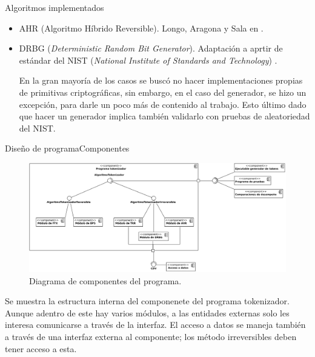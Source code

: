 \begin{frame}{Algoritmos implementados}
\begin{itemize}
\begin{itemize}
        \item<6-> AHR (Algoritmo Híbrido Reversible). Longo, Aragona y Sala
          en \cite{aragona}.

        \item<7-> DRBG (\textit{Deterministic Random Bit Generator}). Adaptación
          a aprtir de estándar del NIST (\textit{National Institute of Standards
          and Technology}) \cite{nist_aleatorios}.

          {
            En la gran mayoría de los casos se buscó no hacer implementaciones
            propias de primitivas criptográficas, sin embargo, en el caso del
            generador, se hizo un excepción, para darle un poco más de contenido
            al trabajo. Esto último dado que hacer un generador implica también
            validarlo con pruebas de aleatoriedad del NIST.
          }

      \end{itemize}
  \end{itemize}
\end{frame}

\begin{frame}{Diseño de programa}{Componentes}

  \begin{figure}[H]
    \begin{center}
      \includegraphics[width=1.0\linewidth]
        {../../../diagramas_comunes/disenio/componentes.png}
      \caption{Diagrama de componentes del programa.}
    \end{center}
  \end{figure}

  \note
  {
    Se muestra la estructura interna del componenete del programa
    tokenizador. Aunque adentro de este hay varios módulos, a las entidades
    externas solo les interesa comunicarse a través de la interfaz. El acceso
    a datos se maneja también a través de una interfaz externa al componente;
    los método irreversibles deben tener acceso a esta.
  }

\end{frame}

